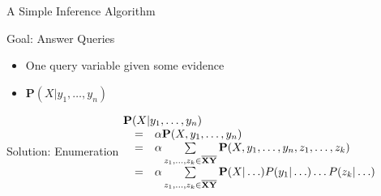 \documentclass[12pt]{beamer}
\begin{document}
\begin{frame}{A Simple Inference Algorithm}
	\begin{block}{Goal: Answer Queries}
		\begin{itemize}
			\item One query variable given some evidence
			\item $\mathbf{P}(X|y_{1},\ldots,y_{n})$
		\end{itemize}
	\end{block}
	\pause
	\begin{block}{Solution: Enumeration}
		$
		\begin{array}{@{}lll@{}}
			\lefteqn{\mathbf{P}(X|y_{1},\ldots,y_{n})} \\
			& = & \alpha\mathbf{P}(X,y_{1},\ldots,y_{n}) \\
			& = & \alpha\sum\limits_{z_{1},\ldots,z_{k} \in \mathbf{\overline{XY}}}
			      {\mathbf{P}(X,y_{1},\ldots,y_{n},z_{1},\ldots,z_{k})} \\
			& = & \alpha\sum\limits_{z_{1},\ldots,z_{k} \in \mathbf{\overline{XY}}}
			      {\mathbf{P}(X|\ldots)
			       P(y_{1}|\ldots)
			       \ldots
			       P(z_{k}|\ldots)} \\
		\end{array}
		$
	\end{block}
\end{frame}
\end{document}

